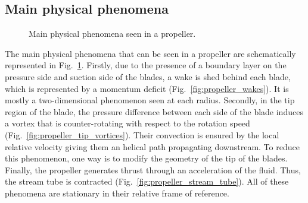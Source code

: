 \subsection{Main physical phenomena}
\label{sub:cror_propeller_physics}

\begin{figure}[htp]
  \centering
  \quad{}
  \quad{}
  \caption{Main physical phenomena seen in a propeller.}
  \label{fig:propeller_phys_phenomena}
\end{figure}
The main physical phenomena that can be seen in a propeller are schematically represented
in Fig.~\ref{fig:propeller_phys_phenomena}. Firstly, due to the presence of a boundary
layer on the pressure side and suction side of the blades, a wake is shed behind each blade, which
is represented by a momentum deficit (Fig.~\ref{fig:propeller_wakes}). 
It is mostly a two-dimensional
phenomenon seen at each radius. Secondly, 
in the tip region of the blade, the pressure difference between each 
side of the blade induces a vortex that is counter-rotating with respect to 
the rotation speed (Fig.~\ref{fig:propeller_tip_vortices}). 
Their convection is ensured by the local relative velocity giving them
an helical path propagating downstream.
To reduce this phenomenon, one way is to modify the geometry of the tip
of the blades.
Finally, the propeller generates thrust through an acceleration of the fluid. Thus, the stream
tube is contracted (Fig.~\ref{fig:propeller_stream_tube}). 
All of these phenomena are stationary in their relative frame of reference.

